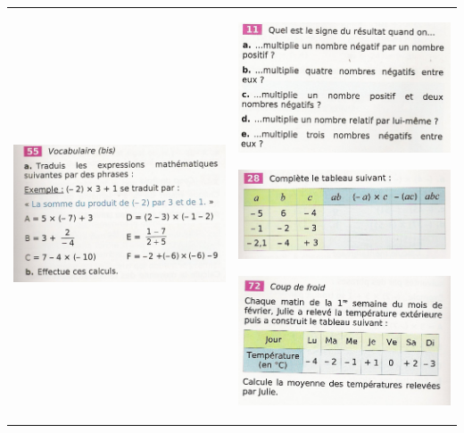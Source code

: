 \documentclass[12pt, twoside]{article}
\begin{document}
\begin{tabular}{cc}
\begin{minipage}{9cm}
\enskip

\includegraphics[width=7cm]{images/ex55p19.jpg}

\end{minipage}
&
\begin{minipage}{9cm}

\includegraphics[width=7cm]{images/ex11p15.jpg}

\enskip

\includegraphics[width=7cm]{images/ex28p17.jpg}

\enskip

\includegraphics[width=7cm]{images/ex72p20.jpg}

\enskip


\end{minipage}
\end{tabular}
\end{document}
